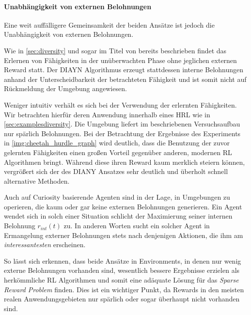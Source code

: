 
\paragraph{Unabhängigkeit von externen Belohnungen}
Eine weit auffälligere Gemeinsamkeit der beiden Ansätze ist jedoch die Unabhängigkeit von externen Belohnungen.

Wie in \ref{sec:diversity} und sogar im Titel von \cite{diversity_eysenbach} bereits beschrieben findet das Erlernen von Fähigkeiten in der unüberwachten Phase ohne jeglichen externen Reward statt. Der DIAYN Algorithmus erzeugt stattdessen interne Belohnungen anhand der Unterscheidbarkeit der betrachteten Fähigkeit und ist somit nicht auf Rückmeldung der Umgebung angewiesen.

Weniger intuitiv verhält es sich bei der Verwendung der erlernten Fähigkeiten. Wir betrachten hierfür deren Anwendung innerhalb eines HRL wie in \ref{sec:examplesdiversity}. Die Umgebung liefert im beschriebenen Versuchsaufbau nur spärlich Belohnungen. Bei der Betrachtung der Ergebnisse des Experiments in \ref{img:cheetah_hurdle_graph} wird deutlich, dass die Benutzung der zuvor gelernten Fähigkeiten einen großen Vorteil gegenüber anderen, modernen RL Algorithmen bringt. Während diese ihren Reward kaum merklich steiern können, vergrößert sich der des DIANY Ansatzes sehr deutlich und überholt schnell alternative Methoden.

Auch auf Curiosity basierende Agenten sind in der Lage, in Umgebungen zu operieren, die kaum oder gar keine externen Belohnungen generieren. Ein Agent wendet sich in solch einer Situation schlicht der Maximierung seiner internen Belohnung \(r_{int}(t)\) zu. In anderen Worten sucht ein solcher Agent in Ermangelung externer Belohnungen stets nach denjenigen Aktionen, die ihm am \emph{interessantesten} erscheinen.

So lässt sich erkennen, dass beide Ansätze in Environments, in denen nur wenig externe Belohnungen vorhanden sind, wesentlich bessere Ergebnisse erzielen als herkömmliche RL Algorithmen und somit eine adäquate Lösung für das \emph{Sparse Reward Problem} finden. Dies ist ein wichtiger Punkt, da Rewards in den meisten realen Anwendungsgebieten nur spärlich oder sogar überhaupt nicht vorhanden sind.

